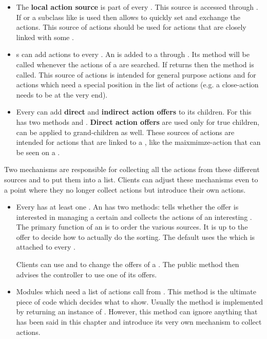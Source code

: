 \begin{itemize}
 \item The \textbf{local action source} is part of every . This source is accessed through . If  or a subclass like  is used then  allows to quickly set and exchange the actions. This source of actions should be used for actions that are closely linked with some .
 \item {}s can add actions to every . An  is added to a  through . Its method  will be called whenever the actions of a  are searched. If  returns  then the method  is called. This source of actions is intended for general purpose actions and for actions which need a special position in the list of actions (e.g. a close-action needs to be at the very end).
 \item Every  can add \textbf{direct} and \textbf{indirect action offers} to its children. For this  has two methods  and . \textbf{Direct action offers} are used only for true children,  can be applied to grand-children as well. These sources of actions are intended for actions that are linked to a , like the maixmimze-action that can be seen on a .
\end{itemize}

Two mechanisms are responsible for collecting all the actions from these different sources and to put them into a list. Clients can adjust these mechanisms even to a point where they no longer collect actions but introduce their own actions.

\begin{itemize}
 \item Every  has at least one . An  has two methods:  tells whether the offer is interested in managing a certain  and  collects the actions of an interesting . The primary function of an  is to order the various sources. It is up to the offer to decide how to actually do the sorting. The default  uses the  which is attached to every .

Clients can use  and  to change the offers of a . The public method  then advises the controller to use one of its offers.

 \item Modules which need a list of actions call  from . This method is the ultimate piece of code which decides what to show. Usually the method is implemented by returning an instance of . However, this method can ignore anything that has been said in this chapter and introduce its very own mechanism to collect actions. 
\end{itemize}

